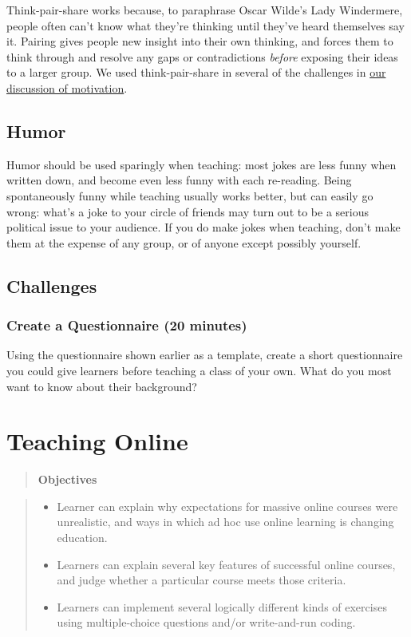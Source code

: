 \documentclass[10pt,statementpaper]{memoir}
\providecommand{\tightlist}{%
  \setlength{\itemsep}{0pt}\setlength{\parskip}{0pt}}
\begin{document}
Think-pair-share works because, to paraphrase Oscar Wilde's Lady
Windermere, people often can't know what they're thinking until they've
heard themselves say it. Pairing gives people new insight into their own
thinking, and forces them to think through and resolve any gaps or
contradictions \emph{before} exposing their ideas to a larger group. We
used think-pair-share in several of the challenges in
\href{motivation.html\#challenges}{our discussion of motivation}.

\section{Humor}\label{humor}

Humor should be used sparingly when teaching: most jokes are less funny
when written down, and become even less funny with each re-reading.
Being spontaneously funny while teaching usually works better, but can
easily go wrong: what's a joke to your circle of friends may turn out to
be a serious political issue to your audience. If you do make jokes when
teaching, don't make them at the expense of any group, or of anyone
except possibly yourself.

\section{Challenges}\label{challenges-8}

\subsection{Create a Questionnaire (20
minutes)}\label{create-a-questionnaire-20-minutes}

Using the questionnaire shown earlier as a template, create a short
questionnaire you could give learners before teaching a class of your
own. What do you most want to know about their background?

\chapter{Teaching Online}\label{teaching-online}

\begin{quote}
\textbf{Objectives}
\end{quote}

\begin{quote}
\begin{itemize}
\tightlist
\item
  Learner can explain why expectations for massive online courses were
  unrealistic, and ways in which ad hoc use online learning is changing
  education.
\item
  Learners can explain several key features of successful online
  courses, and judge whether a particular course meets those criteria.
\item
  Learners can implement several logically different kinds of exercises
  using multiple-choice questions and/or write-and-run coding.
\end{itemize}
\end{quote}
\end{document}
